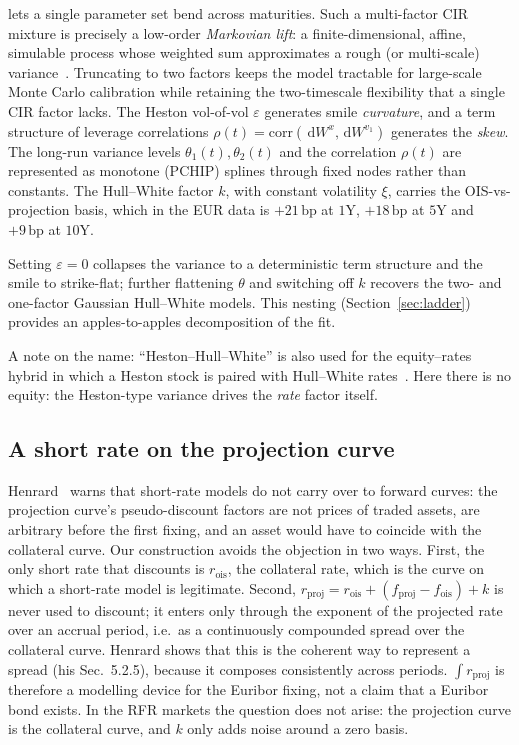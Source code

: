 \documentclass[11pt]{article}
\newcommand{\dW}{\,\mathrm{d}W}
\newcommand{\bp}{\,\text{bp}}
\begin{document}
lets a single parameter set bend across maturities. Such a multi-factor CIR mixture is precisely a
low-order \emph{Markovian lift}: a finite-dimensional, affine, simulable process whose weighted sum
approximates a rough (or multi-scale) variance~\cite{gatheral2018,eleuch2019,abijaber2019multi,abijaber2019lifting,abijaber2019volterra,cuchiero2019}.
Truncating to two factors keeps the model tractable for large-scale Monte Carlo calibration while
retaining the two-timescale flexibility that a single CIR factor lacks. The Heston vol-of-vol
\(\varepsilon\) generates smile \emph{curvature}, and a term structure of leverage correlations
\(\rho(t)=\mathrm{corr}(\dW^{x},\dW^{v_1})\) generates the \emph{skew}. The long-run variance levels
\(\theta_1(t),\theta_2(t)\) and the correlation \(\rho(t)\) are represented as monotone
(PCHIP) splines through fixed nodes rather than constants. The Hull--White factor \(k\), with
constant volatility \(\xi\), carries the OIS-vs-projection basis, which in the EUR data is
\(+21\bp\) at \(1\)Y, \(+18\bp\) at \(5\)Y and \(+9\bp\) at \(10\)Y.

Setting \(\varepsilon=0\) collapses the variance to a deterministic term structure and the smile to
strike-flat; further flattening \(\theta\) and switching off \(k\) recovers the two- and
one-factor Gaussian Hull--White models. This nesting (Section~\ref{sec:ladder}) provides an
apples-to-apples decomposition of the fit.

A note on the name: ``Heston--Hull--White'' is also used for the equity--rates hybrid in which a
Heston stock is paired with Hull--White rates~\cite{grzelak2011}. Here there is no equity: the
Heston-type variance drives the \emph{rate} factor itself.

\subsection{A short rate on the projection curve}
Henrard~\cite[Sec.~5.3]{henrard2026} warns that short-rate models do not carry over to forward
curves: the projection curve's pseudo-discount factors are not prices of traded assets, are
arbitrary before the first fixing, and an asset would have to coincide
with the collateral curve. Our construction avoids the objection in two ways. First, the only
short rate that discounts is \(r_{\text{ois}}\), the collateral rate, which is the curve on which a
short-rate model is legitimate. Second, \(r_{\text{proj}}=r_{\text{ois}}+(f_{\text{proj}}-f_{\text{ois}})+k\)
is never used to discount; it enters only through the exponent of the projected rate over an
accrual period, i.e.\ as a continuously compounded spread over the collateral curve. Henrard shows
that this is the coherent way to represent a spread (his Sec.~5.2.5), because it
composes consistently across periods. \(\int r_{\text{proj}}\) is therefore a modelling device for
the Euribor fixing, not a claim that a Euribor bond exists. In the RFR markets the question does not
arise: the projection curve is the collateral curve, and \(k\) only adds noise around a zero basis.
\end{document}
